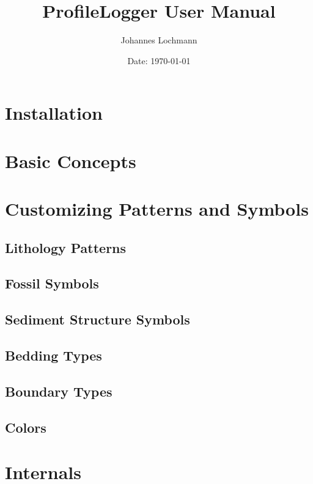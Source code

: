 \documentclass[a4paper, 10pt]{scrreprt}
\begin{document}
\title{ProfileLogger User Manual}
\author{Johannes Lochmann}
\date{Date: \today}
\maketitle

\tableofcontents
\listoffigures
\listoftables

\chapter{Installation}

\chapter{Basic Concepts}

\chapter{Customizing Patterns and Symbols}
\section{Lithology Patterns}
\section{Fossil Symbols}
\section{Sediment Structure Symbols}
\section{Bedding Types}
\section{Boundary Types}
\section{Colors}

\chapter{Internals}
\end{document}
